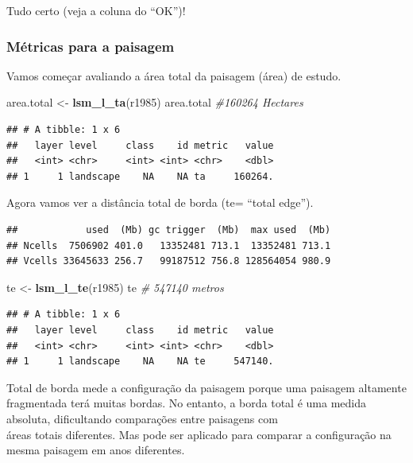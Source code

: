 \documentclass[
]{article}
\newenvironment{Shaded}{\begin{snugshade}}{\end{snugshade}}
\newcommand{\CommentTok}[1]{\textcolor[rgb]{0.56,0.35,0.01}{\textit{#1}}}
\newcommand{\FunctionTok}[1]{\textcolor[rgb]{0.13,0.29,0.53}{\textbf{#1}}}
\newcommand{\NormalTok}[1]{#1}
\newcommand{\OtherTok}[1]{\textcolor[rgb]{0.56,0.35,0.01}{#1}}
\begin{document}
Tudo certo (veja a coluna do ``OK'')!

\hypertarget{muxe9tricas-para-a-paisagem}{%
\subsubsection{Métricas para a paisagem}\label{muxe9tricas-para-a-paisagem}}

Vamos começar avaliando a área total da paisagem (área) de estudo.

\begin{Shaded}
\begin{Highlighting}[]
\NormalTok{area.total }\OtherTok{\textless{}{-}} \FunctionTok{lsm\_l\_ta}\NormalTok{(r1985) }
\NormalTok{area.total }\CommentTok{\#160264 Hectares}
\end{Highlighting}
\end{Shaded}

\begin{verbatim}
## # A tibble: 1 x 6
##   layer level     class    id metric   value
##   <int> <chr>     <int> <int> <chr>    <dbl>
## 1     1 landscape    NA    NA ta     160264.
\end{verbatim}

Agora vamos ver a distância total de borda (te= ``total
edge'').

\begin{verbatim}
##            used  (Mb) gc trigger  (Mb)  max used  (Mb)
## Ncells  7506902 401.0   13352481 713.1  13352481 713.1
## Vcells 33645633 256.7   99187512 756.8 128564054 980.9
\end{verbatim}

\begin{Shaded}
\begin{Highlighting}[]
\NormalTok{te }\OtherTok{\textless{}{-}} \FunctionTok{lsm\_l\_te}\NormalTok{(r1985)}
\NormalTok{te }\CommentTok{\# 547140 metros}
\end{Highlighting}
\end{Shaded}

\begin{verbatim}
## # A tibble: 1 x 6
##   layer level     class    id metric   value
##   <int> <chr>     <int> <int> <chr>    <dbl>
## 1     1 landscape    NA    NA te     547140.
\end{verbatim}

Total de borda mede a configuração da paisagem porque uma paisagem
altamente fragmentada terá muitas bordas. No entanto, a borda total
é uma medida absoluta, dificultando comparações entre paisagens com\\
áreas totais diferentes. Mas pode ser aplicado para comparar a
configuração na mesma paisagem em anos diferentes.
\end{document}
